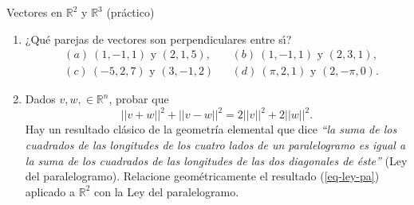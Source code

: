 \begin{chapter}{Vectores en $\mathbb R^2$ y $\mathbb R^3$ (práctico)}
\begin{enumerate}
\item ¿Qu\'e parejas de vectores son perpendiculares entre s{\'\i}?
\begin{align*}
&(a) \ (1, -1,1) \text{ y } (2,1,5), && (b)  \ (1,-1,1) \text{ y } (2,3,1), \\
&(c) \  (-5,2,7)  \text{ y } (3,-1,2) && (d)  \ (\pi,2,1) \text{ y }  (2, -\pi,0).
\end{align*}


\item Dados $v, w,\in \mathbb R^n$, probar que
\begin{equation} \label{eq-ley-pa}
||v + w||^2  + ||v - w||^2= 2||v||^2 + 2||w||^2 . \tag{*}
\end{equation}
Hay un resultado  clásico de la geometría elemental que dice \textit{``la suma de los cuadrados de las longitudes de los cuatro lados de un paralelogramo es igual a la suma de los cuadrados de las longitudes de las dos diagonales de éste''} (Ley del paralelogramo). Relacione geométricamente el  resultado (\ref{eq-ley-pa}) aplicado  a $\mathbb R^2$  con  la Ley del paralelogramo.



\end{enumerate}




\end{chapter}
